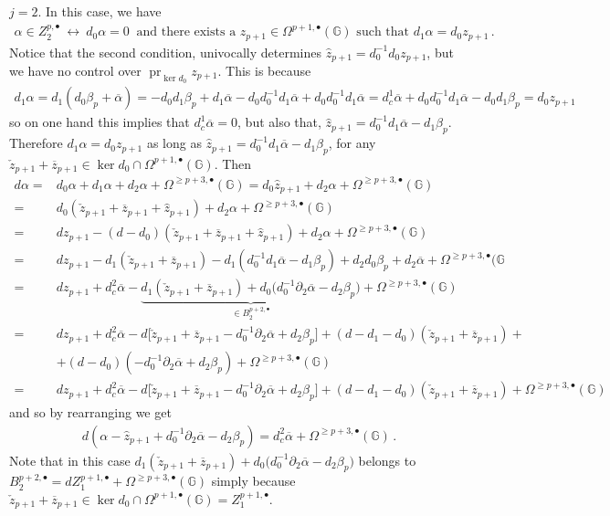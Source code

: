 \documentclass[dvipsnames]{amsart}
\theoremstyle{definition}
\theoremstyle{definition}
\numberwithin{equation}{section}
\newcommand{\G}{\mathbb{G}}
\begin{document}
\medskip
{$j=2$}.
In this case, we have
\begin{align*}
    \alpha\in Z_2^{p,\bullet}\  \longleftrightarrow\ d_0\alpha=0\ \text{ and there exists a }z_{p+1}\in\Omega^{p+1,\bullet}(\G)\text{ such that }d_1\alpha=d_0z_{p+1}\,.
\end{align*}
Notice that the second condition, univocally determines $\hat{z}_{p+1}=d_0^{-1}d_0z_{p+1}$, but we have no control over $\operatorname{pr}_{\ker d_0}z_{p+1}$. This is because
\begin{align*}
    d_1\alpha=d_1(d_0\beta_p+\overline{\alpha})=-d_0d_1\beta_p+d_1\overline{\alpha}-d_0d_0^{-1}d_1\overline{\alpha}+d_0d_0^{-1}d_1\overline{\alpha}=d_c^1\overline{\alpha}+d_0d_0^{-1}d_1\overline{\alpha}-d_0d_1\beta_p=d_0z_{p+1}
\end{align*}
so on one hand this implies that $d_c^1\overline{\alpha}=0$, but also that, $\hat{z}_{p+1}=d_0^{-1}d_1\overline{\alpha}-d_1\beta_p$. Therefore $d_1\alpha=d_0z_{p+1}$ as long as $\hat{z}_{p+1}=d_0^{-1}d_1\overline{\alpha}-d_1\beta_p$, for any $\check{z}_{p+1}+\overline{z}_{p+1}\in\ker d_0\cap\Omega^{p+1,\bullet}(\G)$. Then
\begin{align*}
    d\alpha=&d_0\alpha+d_1\alpha+d_2\alpha+\Omega^{\ge p+3,\bullet}(\G)=d_0\hat{z}_{p+1}+d_2\alpha+\Omega^{\ge p+3,\bullet}(\G)\\=&d_0(\check{z}_{p+1}+\overline{z}_{p+1}+\hat{z}_{p+1})+d_2\alpha+\Omega^{\ge p+3,\bullet}(\G)\\=&dz_{p+1}-(d-d_0)(\check{z}_{p+1}+\overline{z}_{p+1}+\hat{z}_{p+1})+d_2\alpha+\Omega^{\ge p+3,\bullet}(\G)\\
    =&dz_{p+1}-d_1(\check{z}_{p+1}+\overline{z}_{p+1})-d_1(d_0^{-1}d_1\overline{\alpha}-d_1\beta_p)+d_2d_0\beta_p+d_2\overline{\alpha}+\Omega^{\ge p+3,\bullet}(\G\\
    =&dz_{p+1}+d_c^2\overline{\alpha}-\underbrace{d_1(\check{z}_{p+1}+\overline{z}_{p+1})+d_0\big(d_0^{-1}\partial_2\overline{\alpha}-d_2\beta_p\big)}_{\in B_2^{p+2,\bullet}}+\Omega^{\ge p+3,\bullet}(\G)\\=&dz_{p+1}+d_c^2\overline{\alpha}-d\big[\check{z}_{p+1}+\overline{z}_{p+1}-d_0^{-1}\partial_2\overline{\alpha}+d_2\beta_p\big]+(d-d_1-d_0)(\check{z}_{p+1}+\overline{z}_{p+1})+\\&+(d-d_0)(-d_0^{-1}\partial_2\overline{\alpha}+d_2\beta_p)+\Omega^{\ge p+3,\bullet}(\G)\\=&dz_{p+1}+d_c^2\overline{\alpha}-d\big[\check{z}_{p+1}+\overline{z}_{p+1}-d_0^{-1}\partial_2\overline{\alpha}+d_2\beta_p\big]+(d-d_1-d_0)(\check{z}_{p+1}+\overline{z}_{p+1})+\Omega^{\ge p+3,\bullet}(\G)
\end{align*}
and so by rearranging we get
\begin{align*}
    d(\alpha-\hat{z}_{p+1}+d_0^{-1}\partial_2\overline{\alpha}-d_2\beta_p)=d_c^2\overline{\alpha}+\Omega^{\ge p+3,\bullet}(\G)\,.
\end{align*}
Note that in this case $d_1(\check{z}_{p+1}+\overline{z}_{p+1})+d_0\big(d_0^{-1}\partial_2\overline{\alpha}-d_2\beta_p\big)$ belongs to $B_2^{p+2,\bullet}=dZ_1^{p+1,\bullet}+\Omega^{\ge p+3,\bullet}(\G)$ simply because $\check{z}_{p+1}+\overline{z}_{p+1}\in\ker d_0\cap\Omega^{p+1,\bullet}(\G)=Z_1^{p+1,\bullet}$.
\end{document}
